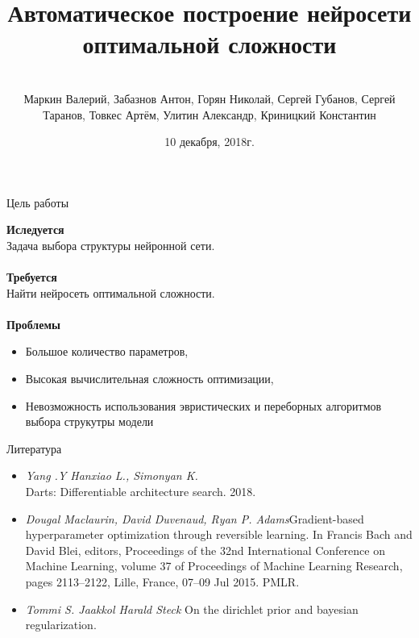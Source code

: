 \documentclass[10pt]{beamer}
\title[\hbox to 56mm{Нейросети оптимальной сложности  \hfill\insertframenumber\,/\,\inserttotalframenumber}]
{Автоматическое построение нейросети оптимальной сложности }
\author[В.\,О. Маркин, А.\,Г. Забазнов, Н.\,А. Горян, С.\,Е. Губанов, С.\,К. Таранов]{\large \\Маркин Валерий, Забазнов Антон, Горян Николай, Сергей Губанов, Сергей Таранов, Товкес Артём, Улитин Александр, Криницкий Константин}
\institute{\large
Московский физико-технический институт}
\date{\footnotesize{10 декабря, 2018г.}}
\begin{document}
\begin{frame}
\titlepage
\end{frame}
\begin{frame}{Цель работы}

{\bf Иследуется}\\
\quad
	 Задача выбора структуры нейронной сети.\\
	~\\

{\bf Требуется}\\
\quad
	Найти нейросеть оптимальной сложности.\\
	~\\

{\bf Проблемы}\\
	\begin{itemize}
		\item Большое количество параметров,
		\item Высокая вычислительная сложность оптимизации,
		\item Невозможность использования эвристических и переборных алгоритмов выбора струкутры модели
	\end{itemize}

\end{frame}

\begin{frame}{Литература}

	\begin{itemize}
		\item \textit{Yang .Y Hanxiao L., Simonyan K.}\\ Darts: Differentiable architecture search. 2018.
		\item	\textit{Dougal Maclaurin, David Duvenaud, Ryan P. Adams}Gradient-based hyperparameter optimization through reversible learning. In Francis Bach and David Blei, editors, Proceedings of the 32nd International Conference on Machine Learning, volume 37 of Proceedings of Machine Learning Research, pages 2113–2122, Lille, France, 07–09 Jul 2015. PMLR.
	\end{itemize}
	
	\begin{itemize}
		\item \textit{Tommi S. Jaakkol Harald Steck} On the dirichlet prior and bayesian regularization.
	\end{itemize}
	
\end{frame}
\end{document}
